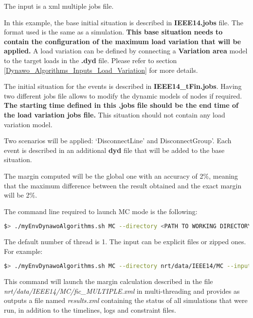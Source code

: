 \documentclass[a4paper, 12pt]{report}
\begin{document}
The input is a xml multiple jobs file.



In this example, the base initial situation is described in \textbf{IEEE14.jobs} file. The format used is the same as a \Dynawo simulation.
\textbf{This base situation needs to contain the configuration of the maximum load variation that will be applied.}
A load variation can be defined by connecting a \textbf{Variation area} model to the target loads in the \textbf{.dyd} file. 
Please refer to section \ref{Dynawo_Algorithms_Inputs_Load_Variation} for more details.

The initial situation for the events is described in \textbf{IEEE14\_tFin.jobs}. Having two different jobs file allows to modify the dynamic models of nodes if required. 
\textbf{The starting time defined in this .jobs file should be the end time of the load variation jobs file.}
This situation should not contain any load variation model. 

Two scenarios will be applied: `DisconnectLine' and DisconnectGroup'. 
Each event is described in an additional \textbf{dyd} file that will be added to the base situation. 

The margin computed will be the global one with an accuracy of 2\%, meaning that the maximum difference between the result obtained and the exact margin will be 2\%.

The command line required to launch MC mode is the following:

\begin{lstlisting}[language=bash, breaklines=true, breakatwhitespace=false]
$> ./myEnvDynawoAlgorithms.sh MC --directory <PATH TO WORKING DIRECTORY> --input <NAME OF INPUT FILE> --output <NAME OF OUTPUT FILE> --nbThreads <NUMBER OF THREADS>
\end{lstlisting}

The default number of thread is 1. The input can be explicit files or zipped ones. For example:

\begin{lstlisting}[language=bash, breaklines=true, breakatwhitespace=false]
$> ./myEnvDynawoAlgorithms.sh MC --directory nrt/data/IEEE14/MC --input fic_MULTIPLE.xml --output results.xml --nbThreads 2
\end{lstlisting}

This command will launch the margin calculation described in the file \textit{nrt/data/IEEE14/MC/fic\_MULTIPLE.xml} in multi-threading 
and provides as outputs a file named \textit{results.xml} containing the status of all simulations that were run, 
in addition to the timelines, logs and constraint files.\\
\end{document}
